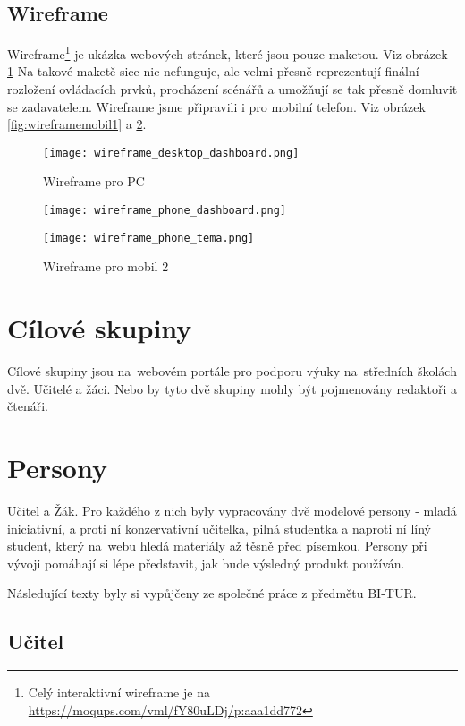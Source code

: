 \documentclass[thesis=B,czech]{FITthesis}[2012/06/26]
\begin{document}
\subsection{Wireframe}

Wireframe\footnote{Celý interaktivní wireframe je na \url{ https://moqups.com/vml/fY80uLDj/p:aaa1dd772}} je ukázka webových stránek, které jsou pouze maketou. Viz obrázek \ref{fig:wireframepc} Na takové maketě sice nic nefunguje, ale velmi přesně reprezentují finální rozložení ovládacích prvků, procházení scénářů a umožňují se tak přesně domluvit se zadavatelem. Wireframe jsme připravili i pro mobilní telefon. Viz obrázek \ref{fig:wireframemobil1} a \ref{fig:wireframemobil2}.

\begin{figure}
  \centering
	\texttt{[image: wireframe\_desktop\_dashboard.png]}
	\caption{Wireframe pro PC} \label{fig:wireframepc} 
\end{figure}

\begin{figure}
  \centering
	\texttt{[image: wireframe\_phone\_dashboard.png]}
	\caption{Wireframe pro mobil 1} \label{fig:wireframemobil1} 
	\texttt{[image: wireframe\_phone\_tema.png]}
	\caption{Wireframe pro mobil 2} \label{fig:wireframemobil2} 
\end{figure}


\section{Cílové skupiny}

Cílové skupiny jsou na~webovém portále pro podporu výuky na~středních školách dvě. Učitelé a žáci. Nebo by tyto dvě skupiny mohly být pojmenovány redaktoři a čtenáři.

\section{Persony}

Učitel a Žák. Pro každého z nich byly vypracovány dvě modelové persony - mladá iniciativní, a proti ní konzervativní učitelka, pilná studentka a naproti ní líný student, který na~webu hledá materiály až těsně před písemkou. Persony při vývoji pomáhají si lépe představit, jak bude výsledný produkt používán.

Následující texty byly si vypůjčeny ze společné práce z předmětu BI-TUR.

\subsection{Učitel}
\end{document}

